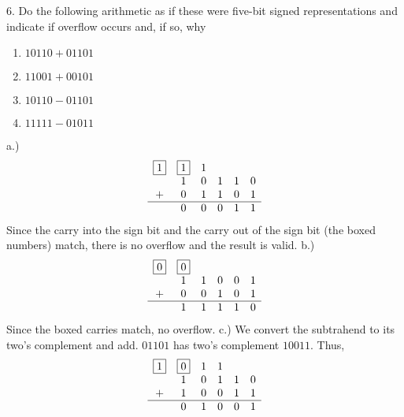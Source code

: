 \documentclass{report}
\begin{document}
    

    \bigbreak \noindent 
    \begin{mdframed}
        6. Do the following arithmetic as if these were five-bit signed representations and indicate if overflow occurs and, if so, why
        \begin{enumerate}[label=(\alph*)]
            \item $10110 + 01101$
            \item $11001 + 00101$
            \item $10110 - 01101$
            \item $11111 - 01011$
        \end{enumerate}
    \end{mdframed}
    \bigbreak \noindent 
    a.) 
    \begin{align*}
        \begin{array}{cccccc}
            \boxed{1} & \boxed{1} & 1 & &  & \\
                     &1&0&1&1&0 \\
            +&0&1&1&0&1 \\
            \hline 
             &0&0&0&1&1
        \end{array}
    \end{align*}
    Since the carry into the sign bit and the carry out of the sign bit (the boxed numbers) match, there is no overflow and the result is valid.
    \bigbreak \noindent 
    b.)
    \begin{align*}
        \begin{array}{cccccc}
            \boxed{0} & \boxed{0} & & & &  \\
                      &1&1&0&0&1 \\
            +&0&0&1&0&1 \\
            \hline 
             &1&1&1&1&0
        \end{array}
    \end{align*}
    Since the boxed carries match, no overflow.
    \bigbreak \noindent 
    c.)  We convert the subtrahend to its two's complement and add. $01101$ has two's complement $10011$. Thus,
    \begin{align*}
        \begin{array}{cccccc}
            \boxed{1} & \boxed{0} & 1&1&& \\
                      &1&0&1&1&0 \\
            +&1&0&0&1&1 \\
            \hline
             &0&1&0&0&1
        \end{array}
    \end{align*}
\end{document}
